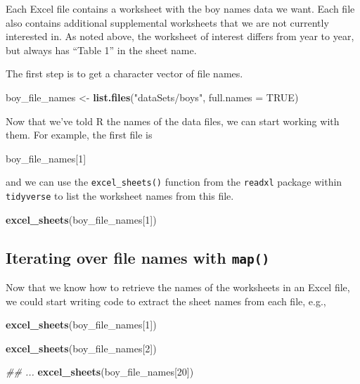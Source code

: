 \documentclass[]{book}
\newenvironment{Shaded}{\begin{snugshade}}{\end{snugshade}}
\newcommand{\CommentTok}[1]{\textcolor[rgb]{0.56,0.35,0.01}{\textit{#1}}}
\newcommand{\DataTypeTok}[1]{\textcolor[rgb]{0.13,0.29,0.53}{#1}}
\newcommand{\DecValTok}[1]{\textcolor[rgb]{0.00,0.00,0.81}{#1}}
\newcommand{\KeywordTok}[1]{\textcolor[rgb]{0.13,0.29,0.53}{\textbf{#1}}}
\newcommand{\NormalTok}[1]{#1}
\newcommand{\OtherTok}[1]{\textcolor[rgb]{0.56,0.35,0.01}{#1}}
\newcommand{\StringTok}[1]{\textcolor[rgb]{0.31,0.60,0.02}{#1}}
\begin{document}
Each Excel file contains a worksheet with the boy names data we want.
Each file also contains additional supplemental worksheets that we are
not currently interested in. As noted above, the worksheet of interest
differs from year to year, but always has ``Table 1'' in the sheet name.

The first step is to get a character vector of file names.

\begin{Shaded}
\begin{Highlighting}[]
\NormalTok{boy_file_names <-}\StringTok{ }\KeywordTok{list.files}\NormalTok{(}\StringTok{"dataSets/boys"}\NormalTok{, }\DataTypeTok{full.names =} \OtherTok{TRUE}\NormalTok{)}
\end{Highlighting}
\end{Shaded}

Now that we've told R the names of the data files, we can start working
with them. For example, the first file is

\begin{Shaded}
\begin{Highlighting}[]
\NormalTok{boy_file_names[}\DecValTok{1}\NormalTok{]}
\end{Highlighting}
\end{Shaded}

and we can use the \texttt{excel\_sheets()} function from the \texttt{readxl} package
within \texttt{tidyverse} to list the worksheet names from this file.

\begin{Shaded}
\begin{Highlighting}[]
\KeywordTok{excel_sheets}\NormalTok{(boy_file_names[}\DecValTok{1}\NormalTok{])}
\end{Highlighting}
\end{Shaded}

\hypertarget{iterating-over-file-names-with-map}{%
\subsection{\texorpdfstring{Iterating over file names with \texttt{map()}}{Iterating over file names with map()}}\label{iterating-over-file-names-with-map}}

Now that we know how to retrieve the names of the worksheets in an
Excel file, we could start writing code to extract the sheet names from
each file, e.g.,

\begin{Shaded}
\begin{Highlighting}[]
\KeywordTok{excel_sheets}\NormalTok{(boy_file_names[}\DecValTok{1}\NormalTok{])}

\KeywordTok{excel_sheets}\NormalTok{(boy_file_names[}\DecValTok{2}\NormalTok{])}

\CommentTok{## ...}
\KeywordTok{excel_sheets}\NormalTok{(boy_file_names[}\DecValTok{20}\NormalTok{])}
\end{Highlighting}
\end{Shaded}
\end{document}
